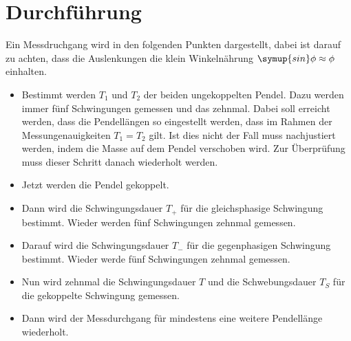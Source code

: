 \section{Durchführung}
\label{sec:Durchführung}
Ein Messdruchgang wird in den folgenden Punkten dargestellt, dabei ist
darauf zu achten, dass die Auslenkungen die klein Winkelnährung $\symup{sin}\phi \approx \phi$
einhalten.
\begin{itemize}
  \item Bestimmt werden $T_1 $ und $T_2$ der beiden ungekoppelten Pendel.
  Dazu werden immer fünf Schwingungen gemessen und das zehnmal.
  Dabei soll erreicht werden, dass die Pendellängen so eingestellt werden,
  dass im Rahmen der Messungenauigkeiten $T_1 = T_2$ gilt. Ist dies nicht der
  Fall muss nachjustiert werden, indem die Masse auf dem Pendel verschoben wird.
  Zur Überprüfung muss dieser Schritt danach wiederholt werden.
  \item Jetzt werden die Pendel gekoppelt.
  \item Dann wird die Schwingungsdauer $T_+$ für die gleichsphasige Schwingung
  bestimmt. Wieder werden fünf Schwingungen zehnmal gemessen.
  \item Darauf wird die Schwingungsdauer $T_-$ für die gegenphasigen Schwingung
  bestimmt. Wieder werde fünf Schwingungen zehnmal gemessen.
  \item Nun wird zehnmal die Schwingungsdauer $T$ und die Schwebungsdauer $T_S$
  für die gekoppelte Schwingung gemessen.
  \item Dann wird der Messdurchgang für mindestens eine weitere Pendellänge
  wiederholt.
\end{itemize}
